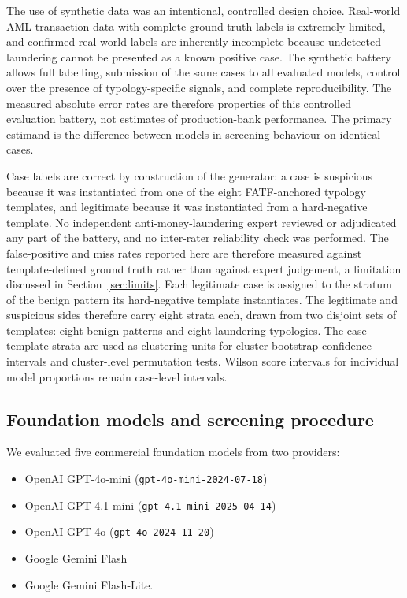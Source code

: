 \documentclass[pdflatex,sn-basic,Numbered]{sn-jnl}
\newcommand{\HLtext}[1]{\texthl{#1}}
\newcommand{\HLcode}[1]{\texthl{#1}}
\newcommand{\HLdel}[1]{\textcolor{HLink}{\sout{#1}}}
\newcommand{\HLhead}[1]{\textcolor{HLink}{#1}}
\renewcommand{\HLhead}[1]{#1}\renewcommand{\HLcode}[1]{#1}%
\renewcommand{\HLtext}[1]{#1}\renewcommand{\HLdel}[1]{#1}%
\begin{document}
The use of synthetic data was an intentional, controlled design choice. Real-world AML transaction data with complete ground-truth labels is extremely limited, and confirmed real-world labels are inherently incomplete because undetected laundering cannot be presented as a known positive case. The synthetic battery allows full labelling, submission of the same cases to all evaluated models, control over the presence of typology-specific signals, and complete reproducibility. The measured absolute error rates are therefore properties of this controlled evaluation battery, not estimates of production-bank performance. The primary estimand is the difference between models in screening behaviour on identical cases.

\HLtext{Case labels are correct by construction of the generator: a case is suspicious because it was instantiated from one of the eight FATF-anchored typology templates, and legitimate because it was instantiated from a hard-negative template. No independent anti-money-laundering expert reviewed or adjudicated any part of the battery, and no inter-rater reliability check was performed. The false-positive and miss rates reported here are therefore measured against template-defined ground truth rather than against expert judgement, a limitation discussed in} Section~\ref{sec:limits}\HLtext{. Each legitimate case is assigned to the stratum of the benign pattern its hard-negative template instantiates. The legitimate and suspicious sides therefore carry eight strata each, drawn from two disjoint sets of templates: eight benign patterns and eight laundering typologies. The case-template strata are used as clustering units for cluster-bootstrap confidence intervals and cluster-level permutation tests. Wilson score intervals for individual model proportions remain case-level intervals.}

\subsection{\HLhead{Foundation models and screening procedure}}\label{sec:design}

We evaluated five commercial foundation models from two providers:

\begin{itemize}
\item OpenAI GPT-4o-mini (\texttt{gpt-4o-mini-2024-07-18}\HLtext{)}
\item \HLtext{OpenAI GPT-4.1-mini (}\texttt{gpt-4.1-mini-2025-04-14}\HLtext{)}
\item \HLtext{OpenAI GPT-4o (}\texttt{gpt-4o-2024-11-20}\HLtext{)}
\item \HLtext{Google Gemini Flash}
\item Google Gemini Flash-Lite.
\end{itemize}
\end{document}
